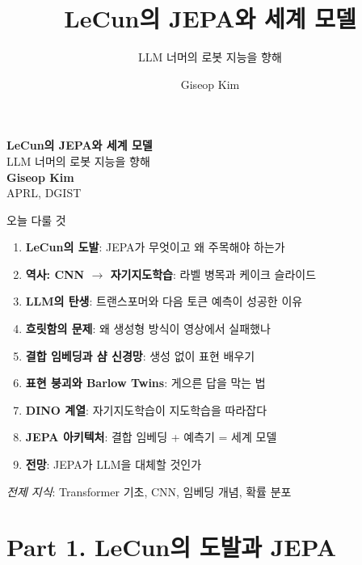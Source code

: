 \documentclass[aspectratio=169,10pt]{beamer}
\title{LeCun의 JEPA와 세계 모델}
\subtitle{LLM 너머의 로봇 지능을 향해}
\author{Giseop Kim}
\institute{APRL, DGIST}
\date{}
\begin{document}
{
\begin{frame}[plain]
\vspace*{1.5cm}
\begin{center}
{\LARGE\textbf{LeCun의 JEPA와 세계 모델}}\\[0.3cm]
{\large LLM 너머의 로봇 지능을 향해}\\[1.5cm]
\textbf{Giseop Kim}\\[0.2cm]
{\small APRL, DGIST}
\end{center}
\end{frame}
}

\begin{frame}{오늘 다룰 것}
\begin{enumerate}
  \item \textbf{LeCun의 도발}: JEPA가 무엇이고 왜 주목해야 하는가
  \item \textbf{역사: CNN $\to$ 자기지도학습}: 라벨 병목과 케이크 슬라이드
  \item \textbf{LLM의 탄생}: 트랜스포머와 다음 토큰 예측이 성공한 이유
  \item \textbf{흐릿함의 문제}: 왜 생성형 방식이 영상에서 실패했나
  \item \textbf{결합 임베딩과 샴 신경망}: 생성 없이 표현 배우기
  \item \textbf{표현 붕괴와 Barlow Twins}: 게으른 답을 막는 법
  \item \textbf{DINO 계열}: 자기지도학습이 지도학습을 따라잡다
  \item \textbf{JEPA 아키텍처}: 결합 임베딩 + 예측기 = 세계 모델
  \item \textbf{전망}: JEPA가 LLM을 대체할 것인가
\end{enumerate}

\vspace{0.8em}
\footnotesize
\textit{전제 지식}: Transformer 기초, CNN, 임베딩 개념, 확률 분포
\end{frame}

\section{Part 1. LeCun의 도발과 JEPA}
\end{document}
